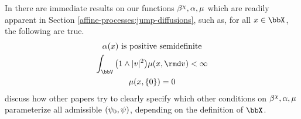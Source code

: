 \begin{remark}
  \label{remark:affine-admissibility}
  In \cite{cuchiero2011} there are immediate results on our functions $\beta^\chi, \alpha, \mu$ which are readily apparent in Section \ref{affine-processes:jump-diffusions}, such as, for all $\stateVar \in \stateSpace$, the following are true.
  \begin{equation}
    \label{eq:affine-maps-characteristic-consequences}
    \begin{gathered}
      \affDiff(\stateVar) \text{ is positive semidefinite} \\
      \int_\vecSpace \big(1 \wedge |\markVar|^2 \big) \affJump(\stateVar, \rmd\markVar) < \infty \\
      \affJump(\stateVar, \{0\}) = 0
    \end{gathered}
  \end{equation}
  \color{gray}
  discuss how other papers try to clearly specify which other conditions on $\beta^\chi, \alpha, \mu$ parameterize all admissible $(\psi_0, \psi)$, depending on the definition of $\stateSpace$.
\end{remark}
